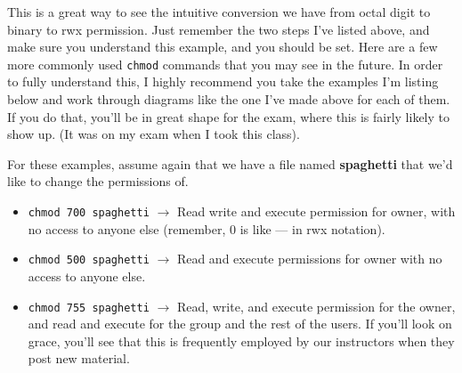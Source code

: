 \documentclass[english, 10pt]{article}
\begin{document}
{

}

This is a great way to see the intuitive conversion we have from octal digit to binary to rwx permission. Just remember the two steps I've listed above, and make sure you understand this example, and you should be set. Here are a few more commonly used \texttt{chmod} commands that you may see in the future. In order to fully understand this, I highly recommend you take the examples I'm listing below and work through diagrams like the one I've made above for each of them. If you do that, you'll be in great shape for the exam, where this is fairly likely to show up. (It was on my exam when I took this class).\newline

For these examples, assume again that we have a file named \textbf{spaghetti} that we'd like to change the permissions of. \newline

\begin{itemize}
	\item \texttt{chmod 700 spaghetti} $\rightarrow$ Read write and execute permission for owner, with no access to anyone else (remember, 0 is like --- in rwx notation).
	\item \texttt{chmod 500 spaghetti} $\rightarrow$ Read and execute permissions for owner with no access to anyone else.
	\item \texttt{chmod 755 spaghetti} $\rightarrow$ Read, write, and execute permission for the owner, and read and execute for the group and the rest of the users. If you'll look on grace, you'll see that this is frequently employed by our instructors when they post new material.
\end{itemize}
\end{document}
